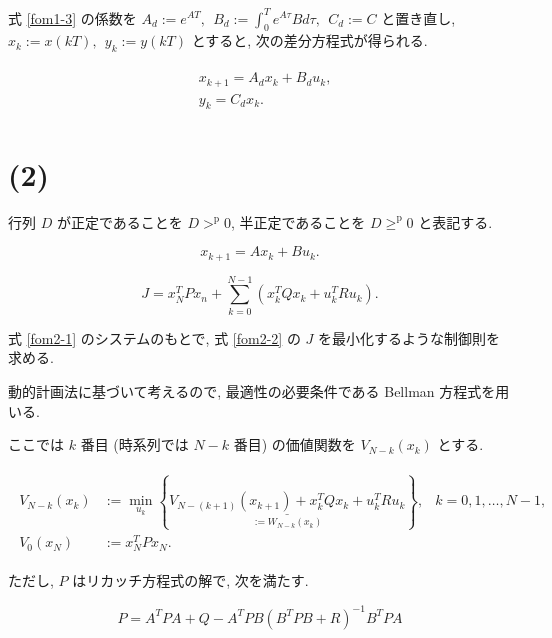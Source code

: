 \documentclass[10pt, fleqn, dvipdfmx]{article}
\begin{document}
式 \eqref{fom1-3} の係数を
$A_d := e^{AT}, ~~ B_d := \int_0^T e^{A \tau} B d\tau, ~~ C_d := C$
と置き直し, $x_k := x(kT), ~~ y_k := y(kT)$
とすると, 次の差分方程式が得られる.

\begin{align}
	\begin{aligned}
		 & x_{k+1} = A_d x_k + B_d u_k, \\
		 & y_k = C_d x_k.
	\end{aligned}
	\label{fom1-4}
\end{align}

\section*{(2)}

行列 $D$ が正定であることを $D >^\mathrm{p} 0$,
半正定であることを $D \geq^\mathrm{p} 0$ と表記する.

\begin{equation}
	x_{k+1} = A x_k + B u_k.
	\label{fom2-1}
\end{equation}

\begin{equation}
	J = x_N^T P x_n + \sum_{k=0}^{N-1} \left( x_k^T Q x_k + u_k^T R u_k \right).
	\label{fom2-2}
\end{equation}

式 \eqref{fom2-1} のシステムのもとで,
式 \eqref{fom2-2} の $J$ を最小化するような制御則を求める.

動的計画法に基づいて考えるので, 最適性の必要条件である Bellman 方程式を用いる.

ここでは $k$ 番目 (時系列では $N-k$ 番目) の価値関数を $V_{N-k} (x_k)$ とする.

\begin{align}
	\begin{aligned}
		V_{N-k} (x_k) & := \min_{u_k}
		\left\{
		\underset{:= W_{N-k}(x_k)}{
			\underline{V_{N-(k+1)} (x_{k+1}) + x_k^T Q x_k + u_k^T R u_k}
		}
		\right\},
		              & k = 0, 1, \dots, N-1, \\
		V_{0} (x_N)   & := x_N^T P x_N.
	\end{aligned}
	\label{fom2-3}
\end{align}

ただし, $P$ はリカッチ方程式の解で, 次を満たす.

\begin{equation}
	P = A^T P A + Q - A^T P B ( B^T P B + R )^{-1} B^T P A
\end{equation}
\end{document}
